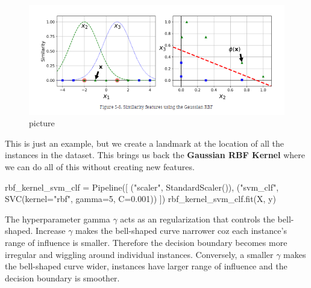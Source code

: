 \documentclass[
  letterpaper,
  DIV=11,
  numbers=noendperiod]{scrartcl}
\newenvironment{Shaded}{\begin{snugshade}}{\end{snugshade}}
\newcommand{\DecValTok}[1]{\textcolor[rgb]{0.68,0.00,0.00}{#1}}
\newcommand{\FloatTok}[1]{\textcolor[rgb]{0.68,0.00,0.00}{#1}}
\newcommand{\NormalTok}[1]{\textcolor[rgb]{0.00,0.23,0.31}{#1}}
\newcommand{\OperatorTok}[1]{\textcolor[rgb]{0.37,0.37,0.37}{#1}}
\newcommand{\StringTok}[1]{\textcolor[rgb]{0.13,0.47,0.30}{#1}}
\begin{document}
\begin{figure}[H]

{\centering \includegraphics{4.png}

}

\caption{picture}

\end{figure}%

This is just an example, but we create a landmark at the location of all
the instances in the dataset. This brings us back the \textbf{Gaussian
RBF Kernel} where we can do all of this without creating new features.

\begin{Shaded}
\begin{Highlighting}[]
\NormalTok{rbf\_kernel\_svm\_clf }\OperatorTok{=}\NormalTok{ Pipeline([}
\NormalTok{        (}\StringTok{"scaler"}\NormalTok{, StandardScaler()),}
\NormalTok{        (}\StringTok{"svm\_clf"}\NormalTok{, SVC(kernel}\OperatorTok{=}\StringTok{"rbf"}\NormalTok{, gamma}\OperatorTok{=}\DecValTok{5}\NormalTok{, C}\OperatorTok{=}\FloatTok{0.001}\NormalTok{))}
\NormalTok{    ])}
\NormalTok{rbf\_kernel\_svm\_clf.fit(X, y)}
\end{Highlighting}
\end{Shaded}

The hyperparameter gamma \(\gamma\) acts as an regularization that
controls the bell-shaped. Increase \(\gamma\) makes the bell-shaped
curve narrower coz each instance's range of influence is smaller.
Therefore the decision boundary becomes more irregular and wiggling
around individual instances. Conversely, a smaller \(\gamma\) makes the
bell-shaped curve wider, instances have larger range of influence and
the decision boundary is smoother.
\end{document}
